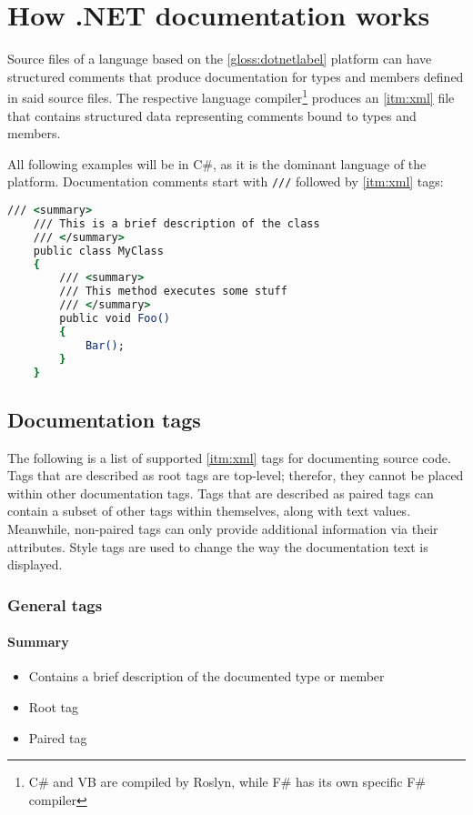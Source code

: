\chapter{How .NET documentation works} \label{chap:netDocumentation}

Source files of a language based on the \ref{gloss:dotnetlabel} platform can have structured comments that produce documentation for types and members defined in said source files. The respective language compiler\footnote{C\# and VB are compiled by Roslyn, while F\# has its own specific F\# compiler} produces an \ref{itm:xml} file that contains structured data representing comments bound to types and members.
\cite{wagner_xml_2022}

All following examples will be in C\#, as it is the dominant language of the platform. Documentation comments start with \lstinline[language=csh]{///} followed by \ref{itm:xml} tags:

\begin{lstlisting}[language=csh]
    /// <summary>
    /// This is a brief description of the class
    /// </summary>
    public class MyClass
    {
        /// <summary>
        /// This method executes some stuff
        /// </summary>
        public void Foo()
        {
            Bar();
        }
    }
\end{lstlisting}

\section{Documentation tags}

The following is a list of supported \ref{itm:xml} tags for documenting source code.
Tags that are described as root tags are top-level; therefor, they cannot be placed within other documentation tags.
Tags that are described as paired tags can contain a subset of other tags within themselves, along with text values.
Meanwhile, non-paired tags can only provide additional information via their attributes.
Style tags are used to change the way the documentation text is displayed.

\subsection{General tags}

\subsubsection*{Summary}
\begin{itemize}
    \item Contains a brief description of the documented type or member
    \item Root tag
    \item Paired tag
\end{itemize}

